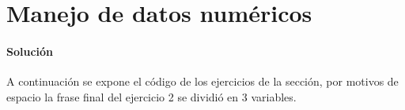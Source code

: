 \section{Manejo de datos numéricos}

    \paragraph{Solución}
    A continuación se expone el código de los ejercicios de la sección, por motivos de espacio la frase final del ejercicio 2 se dividió en 3 variables.
    
    
    